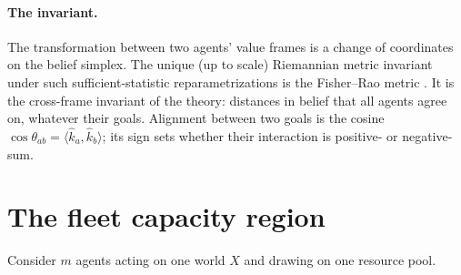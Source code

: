 \documentclass[11pt]{article}
\theoremstyle{plain}
\theoremstyle{definition}
\theoremstyle{remark}
\begin{document}
\paragraph{The invariant.} The transformation between two agents' value frames is a change of coordinates on the
belief simplex. The unique (up to scale) Riemannian metric invariant under such sufficient-statistic
reparametrizations is the Fisher--Rao metric \citep{cencov1982,amari2016}. It is the cross-frame invariant of
the theory: distances in belief that all agents agree on, whatever their goals. Alignment between two goals is
the cosine $\cos\theta_{ab}=\langle \hat k_a,\hat k_b\rangle$; its sign sets whether their interaction is
positive- or negative-sum.

\section{The fleet capacity region}\label{sec:fleet}

Consider $m$ agents acting on one world $X$ and drawing on one resource pool.
\end{document}
